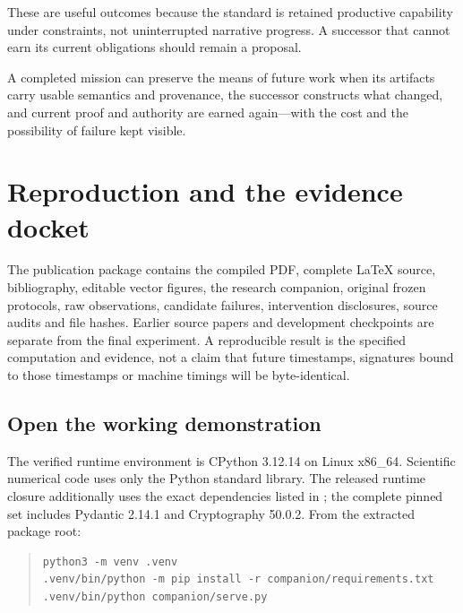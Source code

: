 \documentclass[11pt]{article}
\begin{document}
These are useful outcomes because the standard is retained productive capability under constraints, not uninterrupted narrative progress. A successor that cannot earn its current obligations should remain a proposal.

\begin{insight}[title={The contribution in one sentence}]
A completed mission can preserve the means of future work when its artifacts carry usable semantics and provenance, the successor constructs what changed, and current proof and authority are earned again---with the cost and the possibility of failure kept visible.
\end{insight}



\section{Reproduction and the evidence docket}
\label{sec:reproduction}

The publication package contains the compiled PDF, complete LaTeX source, bibliography, editable vector figures, the research companion, original frozen protocols, raw observations, candidate failures, intervention disclosures, source audits and file hashes. Earlier source papers and development checkpoints are separate from the final experiment. A reproducible result is the specified computation and evidence, not a claim that future timestamps, signatures bound to those timestamps or machine timings will be byte-identical.

\subsection{Open the working demonstration}

The verified runtime environment is CPython 3.12.14 on Linux x86\_64. Scientific numerical code uses only the Python standard library. The released runtime closure additionally uses the exact dependencies listed in ; the complete pinned set includes Pydantic 2.14.1 and Cryptography 50.0.2. From the extracted package root:

\begin{quote}\small
\begin{verbatim}
python3 -m venv .venv
.venv/bin/python -m pip install -r companion/requirements.txt
.venv/bin/python companion/serve.py
\end{verbatim}
\end{quote}
\end{document}
